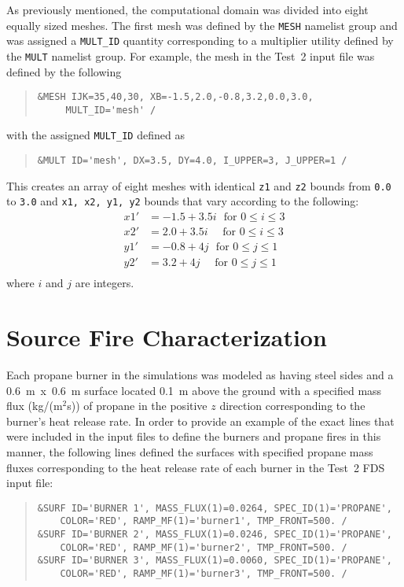 As previously mentioned, the computational domain was divided into eight equally sized meshes. The first mesh was defined by the \verb|MESH| namelist group and was assigned a \verb|MULT_ID| quantity corresponding to a multiplier utility defined by the \verb|MULT| namelist group. For example, the mesh in the Test~2 input file was defined by the following
\begin{quote}
\begin{verbatim}
&MESH IJK=35,40,30, XB=-1.5,2.0,-0.8,3.2,0.0,3.0, 
     MULT_ID='mesh' / 
\end{verbatim}
\end{quote}
with the assigned \verb|MULT_ID| defined as 
\begin{quote}
\begin{verbatim}
&MULT ID='mesh', DX=3.5, DY=4.0, I_UPPER=3, J_UPPER=1 /
\end{verbatim}
\end{quote}
This creates an array of eight meshes with identical \verb|z1| and \verb|z2| bounds from \verb|0.0| to \verb|3.0| and \verb|x1, x2, y1, y2| bounds that vary according to the following:
\begin{equation*}
\begin{split}
	x1' &= -1.5+3.5i \textrm{~~for~} 0 \leq i \leq 3 \\
	x2' &= 2.0+3.5i \textrm{~~~~for~} 0 \leq i \leq 3 \\
	y1' &= -0.8+4j \textrm{~~for~} 0 \leq j \leq 1 \\
	y2' &= 3.2+4j \textrm{~~~~for~} 0 \leq j \leq 1 \\
\end{split}
\end{equation*}
where $i$ and $j$ are integers.

\section{Source Fire Characterization}
Each propane burner in the simulations was modeled as having steel sides and a 0.6~m~x~0.6~m surface located 0.1~m above the ground with a specified mass flux (kg/(m$^2$s)) of propane in the positive $z$ direction corresponding to the burner's heat release rate. In order to provide an example of the exact lines that were included in the input files to define the burners and propane fires in this manner, the following lines defined the surfaces with specified propane mass fluxes corresponding to the heat release rate of each burner in the Test~2 FDS input file: 
\begin{quote}
\begin{verbatim}
&SURF ID='BURNER 1', MASS_FLUX(1)=0.0264, SPEC_ID(1)='PROPANE', 
    COLOR='RED', RAMP_MF(1)='burner1', TMP_FRONT=500. /
&SURF ID='BURNER 2', MASS_FLUX(1)=0.0246, SPEC_ID(1)='PROPANE', 
    COLOR='RED', RAMP_MF(1)='burner2', TMP_FRONT=500. /
&SURF ID='BURNER 3', MASS_FLUX(1)=0.0060, SPEC_ID(1)='PROPANE', 
    COLOR='RED', RAMP_MF(1)='burner3', TMP_FRONT=500. /
\end{verbatim}
\end{quote}

